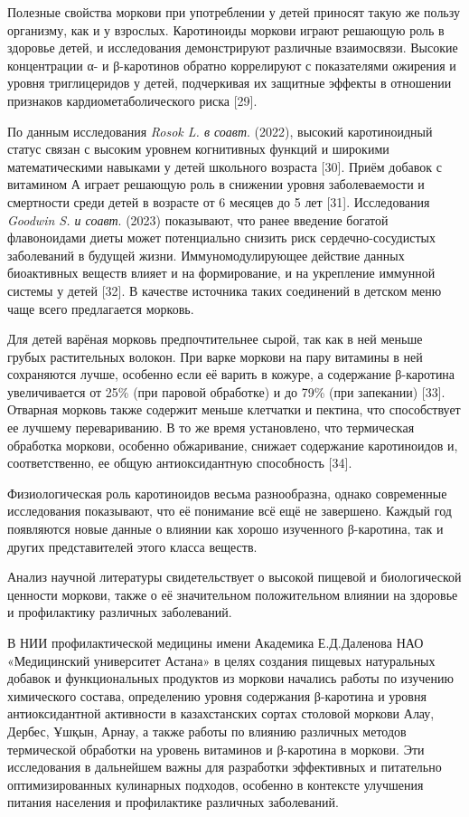 Полезные свойства моркови при употреблении у детей приносят такую же
пользу организму, как и у взрослых. Каротиноиды моркови играют решающую
роль в здоровье детей, и исследования демонстрируют различные
взаимосвязи. Высокие концентрации α- и β-каротинов обратно коррелируют с
показателями ожирения и уровня триглицеридов у детей, подчеркивая их
защитные эффекты в отношении признаков кардиометаболического риска
{[}29{]}.

По данным исследования \emph{Rosok L. в соавт}. (2022), высокий
каротиноидный статус связан с высоким уровнем когнитивных функций и
широкими математическими навыками у детей школьного возраста {[}30{]}.
Приём добавок с витамином А играет решающую роль в снижении уровня
заболеваемости и смертности среди детей в возрасте от 6 месяцев до 5 лет
{[}31{]}. Исследования \emph{Goodwin S. и соавт}. (2023) показывают, что
ранее введение богатой флавоноидами диеты может потенциально снизить
риск сердечно-сосудистых заболеваний в будущей жизни. Иммуномодулирующее
действие данных биоактивных веществ влияет и на формирование, и на
укрепление иммунной системы у детей {[}32{]}. В качестве источника таких
соединений в детском меню чаще всего предлагается морковь.

Для детей варёная морковь предпочтительнее сырой, так как в ней меньше
грубых растительных волокон. При варке моркови на пару витамины в ней
сохраняются лучше, особенно если её варить в кожуре, а содержание
β-каротина увеличивается от 25\% (при паровой обработке) и до 79\% (при
запекании) {[}33{]}. Отварная морковь также содержит меньше клетчатки и
пектина, что способствует ее лучшему перевариванию. В то же время
установлено, что термическая обработка моркови, особенно обжаривание,
снижает содержание каротиноидов и, соответственно, ее общую
антиоксидантную способность {[}34{]}.

Физиологическая роль каротиноидов весьма разнообразна, однако
современные исследования показывают, что её понимание всё ещё не
завершено. Каждый год появляются новые данные о влиянии как хорошо
изученного β-каротина, так и других представителей этого класса веществ.

Анализ научной литературы свидетельствует о высокой пищевой и
биологической ценности моркови, также о её значительном положительном
влиянии на здоровье и профилактику различных заболеваний.

В НИИ профилактической медицины имени Академика Е.Д.Даленова НАО
«Медицинский университет Астана» в целях создания пищевых натуральных
добавок и функциональных продуктов из моркови начались работы по
изучению химического состава, определению уровня содержания β-каротина и
уровня антиоксидантной активности в казахстанских сортах столовой
моркови Алау, Дербес, Ұшқын, Арнау, а также работы по влиянию различных
методов термической обработки на уровень витаминов и β-каротина в
моркови. Эти исследования в дальнейшем важны для разработки эффективных
и питательно оптимизированных кулинарных подходов, особенно в контексте
улучшения питания населения и профилактике различных заболеваний.

